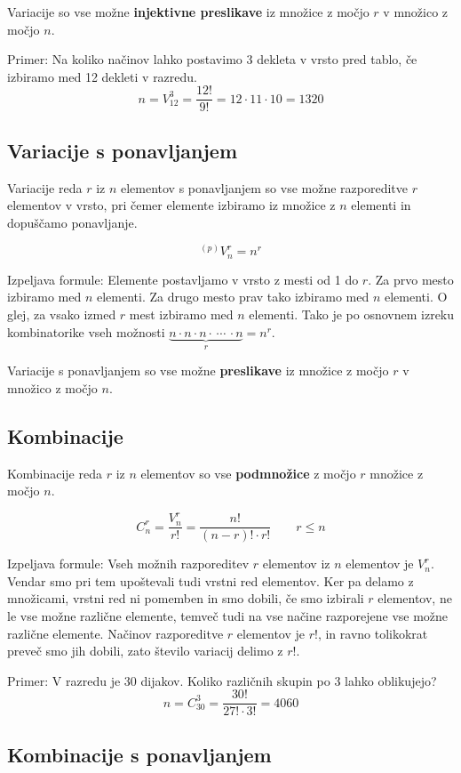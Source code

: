 \documentclass[a4paper,oneside,12pt,fleqn]{article}
\newcommand\krat\cdot
\numberwithin{equation}{section}
\begin{document}
Variacije so vse možne \textbf{injektivne preslikave} iz množice z močjo $r$ v množico z močjo
$n$.

Primer: Na koliko načinov lahko postavimo 3 dekleta v vrsto pred tablo, če izbiramo med 12
dekleti v razredu.
\[ n = V_{12}^3 = \frac{12!}{9!} = 12\krat 11 \krat 10 = 1320 \]

\subsection{Variacije s ponavljanjem}
\label{sec:komb:varp}
Variacije reda $r$ iz $n$ elementov s ponavljanjem so vse možne razporeditve $r$ elementov
v vrsto, pri čemer elemente izbiramo iz množice z $n$ elementi in dopuščamo ponavljanje.

\[ ^{(p)}V_n^r = n^r \]

Izpeljava formule: Elemente postavljamo v vrsto z mesti od 1 do $r$. Za prvo mesto izbiramo
med $n$ elementi. Za drugo mesto prav tako izbiramo med $n$ elementi. O glej, za vsako
izmed $r$ mest izbiramo med $n$ elementi. Tako je po osnovnem izreku kombinatorike vseh
možnosti $\underbrace{n \krat n \krat n \krat \, \cdots \, \krat n}_{r} = n^r$.

Variacije s ponavljanjem so vse možne \textbf{preslikave} iz množice z močjo $r$ v množico z močjo
$n$.

\subsection{Kombinacije}
\label{sec:komb:komb}

Kombinacije reda $r$ iz $n$ elementov so vse \textbf{podmnožice} z močjo $r$ množice z močjo $n$.

\[ C_n^r = \frac{V_n^r}{r!} = \frac{n!}{(n-r)!\krat r!} \qquad r \le n\]

Izpeljava formule: Vseh možnih razporeditev $r$ elementov iz $n$ elementov je $V_n^r$.
Vendar smo pri tem upoštevali tudi vrstni red elementov. Ker pa delamo z množicami, vrstni
red ni pomemben in smo dobili, če smo izbirali $r$ elementov, ne le vse možne različne
elemente, temveč tudi na vse načine razporejene vse možne različne elemente. Načinov
razporeditve $r$ elementov je $r!$, in ravno tolikokrat preveč smo jih dobili, zato
število variacij delimo z $r!$.

Primer: V razredu je 30 dijakov. Koliko različnih skupin po 3 lahko oblikujejo?
\[ n = C_{30}^3 = \frac{30!}{27!\krat 3!} = 4060 \]

\subsection{Kombinacije s ponavljanjem}
\label{sec:komb:kombp}
\end{document}
